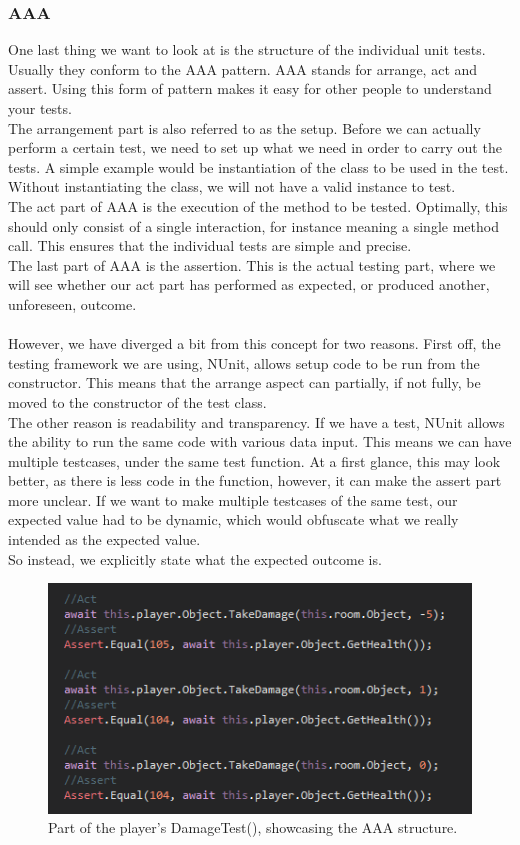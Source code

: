\subsubsection{AAA}
One last thing we want to look at is the structure of the individual unit tests. Usually they conform to the AAA pattern. AAA stands for arrange, act and assert. Using this form of pattern makes it easy for other people to understand your tests\cite{TestingAdaptiveCode}. \\
The arrangement part is also referred to as the setup. Before we can actually perform a certain test, we need to set up what we need in order to carry out the tests. A simple example would be instantiation of the class to be used in the test. Without instantiating the class, we will not have a valid instance to test. \\
The act part of AAA is the execution of the method to be tested. Optimally, this should only consist of a single interaction, for instance meaning a single method call\cite{TestingCodeComplete}. This ensures that the individual tests are simple and precise. \\
The last part of AAA is the assertion. This is the actual testing part, where we will see whether our act part has performed as expected, or produced another, unforeseen, outcome. \\
\\
However, we have diverged a bit from this concept for two reasons. First off, the testing framework we are using, NUnit, allows setup code to be run from the constructor. This means that the arrange aspect can partially, if not fully, be moved to the constructor of the test class. \\
The other reason is readability and transparency. If we have a test, NUnit allows the ability to run the same code with various data input. This means we can have multiple testcases, under the same test function. At a first glance, this may look better, as there is less code in the function, however, it can make the assert part more unclear. If we want to make multiple testcases of the same test, our expected value had to be dynamic, which would obfuscate what we really intended as the expected value. \\
So instead, we explicitly state what the expected outcome is. 
\begin{figure} %
    \centering
    \includegraphics[width=0.8\linewidth]{Materials/TestingTheory/playerTakeDamageAAAtest}
    \caption{Part of the player's DamageTest(), showcasing the AAA structure.}
    \label{playerDamageTest}
\end{figure}
